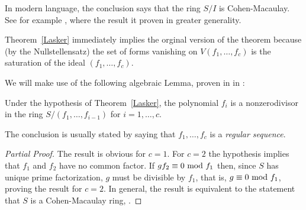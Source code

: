 In modern language, the conclusion says that the ring $S/I$ is Cohen-Macaulay. See for example \cite[Chapter 18]{Eisenbud95}, where the result it proven in greater generality.

Theorem~\ref{Lasker} immediately implies the orginal version of the theorem because (by the Nullstellensatz) the set of forms vanishing on $V(f_{1}, \dots, f_{c})$ is the saturation 
of the ideal $(f_{1}, \dots, f_{c})$. 

We will make use of the following algebraic Lemma, proven in  in \cite[Theorem 18.***]{Eisenbud95}:

\begin{lemma}\label{Cohen-Macaulay}
 Under the hypothesis of Theorem~\ref{Lasker}, the polynomial $f_{i}$ is a nonzerodivisor in the ring 
$S/(f_{1}, \dots, f_{i-1})$ for $i = 1, \dots, c$.
\end{lemma}

The conclusion is usually stated by saying that   $f_{1}, \dots, f_{c}$ is a \emph{regular sequence}.

\begin{proof}[Partial Proof]
 The result is obvious for $c=1$. For $c=2$ the hypothesis implies that $f_{1}$ and $f_{2}$ have no common factor.
If $g f_{2} \equiv 0\ {\rm mod}\ f_{1}$ then, since $S$ has unique prime factorization, $g$ must be divisible by
$f_{1}$, that is, $g  \equiv 0\ {\rm mod}\ f_{1}$, proving the result for $c=2$. In general, the result is equivalent to the 
statement that $S$ is a Cohen-Macaulay ring,  \cite[Proposition 18.9]{Eisenbud95}.
\end{proof}


